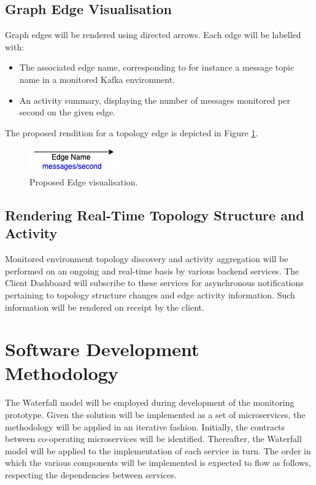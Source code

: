 \subsection{Graph Edge Visualisation}
Graph edges will be rendered using directed arrows. Each edge will be labelled with:

\begin{itemize}
	\item  The associated edge name, corresponding to for instance a message topic name in a monitored Kafka environment.
	\item An activity summary, displaying the number of messages monitored per second on the given edge. 
\end{itemize}

The proposed rendition for a topology edge is depicted in Figure \ref{dashboard_edge_high_level}.
\vspace{5mm}

\begin{figure}[H]
	\centering  
	\includegraphics{figures/design/dashboard_edge_high_level.png}
	\caption{Proposed Edge visualisation.}
	\label{dashboard_edge_high_level}
\end{figure}

\subsection{Rendering Real-Time Topology Structure and Activity}

Monitored environment topology discovery and activity aggregation will be performed on an ongoing and real-time basis by various backend services. The Client Dashboard will subscribe to these services for asynchronous notifications pertaining to topology structure changes and edge activity information. Such information will be rendered on receipt by the client. 

\section{Software Development Methodology}\label{design_methodology}

The Waterfall model\cite{Palmquist13parallelworlds} will be employed during development of the monitoring prototype. Given the solution will be implemented as a set of microservices, the methodology will be applied in an iterative fashion. Initially, the contracts between co-operating microservices will be identified. Thereafter, the Waterfall model will be applied to the implementation of each service in turn. The order in which the various components will be implemented is expected to flow as follows, respecting the dependencies between services.

